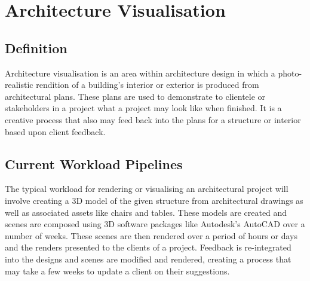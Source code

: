 \section{Architecture Visualisation}

    \subsection{Definition}
    
        Architecture visualisation is an area within architecture design in which a photo-realistic rendition of a building's interior or exterior is produced from architectural plans. These plans are used to demonstrate to clientele or stakeholders in a project what a project may look like when finished. It is a creative process that also may feed back into the plans for a structure or interior based upon client feedback.
    
    \subsection{Current Workload Pipelines}
    
        The typical workload for rendering or visualising an architectural project will involve creating a 3D model of the given structure from architectural drawings as well as associated assets like chairs and tables. These models are created and scenes are composed using 3D software packages like Autodesk's AutoCAD over a number of weeks. These scenes are then rendered over a period of hours or days and the renders presented to the clients of a project. Feedback is re-integrated into the designs and scenes are modified and rendered, creating a process that may take a few weeks to update a client on their suggestions.